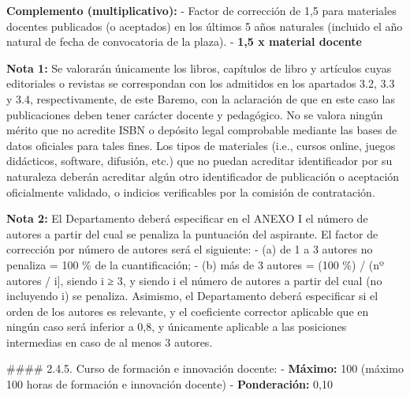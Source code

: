 \documentclass{article}
\begin{document}
\begin{itemize}
\begin{itemize}
\begin{scriptsize}
                  \textbf{Complemento (multiplicativo):}
                  - Factor de corrección de 1,5 para materiales docentes publicados (o aceptados) en los últimos 5 años naturales (incluido el año natural de fecha de convocatoria de la plaza).
                  - \textbf{1,5 x material docente}

                  \textbf{Nota 1:} Se valorarán únicamente los libros, capítulos de libro y artículos cuyas editoriales o revistas se correspondan con los admitidos en los apartados 3.2, 3.3 y 3.4, respectivamente, de este Baremo, con la aclaración de que en este caso las publicaciones deben tener carácter docente y pedagógico. No se valora ningún mérito que no acredite ISBN o depósito legal comprobable mediante las bases de datos oficiales para tales fines. Los tipos de materiales (i.e., cursos online, juegos didácticos, software, difusión, etc.) que no puedan acreditar identificador por su naturaleza deberán acreditar algún otro identificador de publicación o aceptación oficialmente validado, o indicios verificables por la comisión de contratación.

                  \textbf{Nota 2:} El Departamento deberá especificar en el ANEXO I el número de autores a partir del cual se penaliza la puntuación del aspirante. El factor de corrección por número de autores será el siguiente:
                  - (a) de 1 a 3 autores no penaliza = 100 \% de la cuantificación;
                  - (b) más de 3 autores = (100 \%) / (nº autores / i], siendo i ≥ 3, y siendo i el número de autores a partir del cual (no incluyendo i) se penaliza. Asimismo, el Departamento deberá especificar si el orden de los autores es relevante, y el coeficiente corrector aplicable que en ningún caso será inferior a 0,8, y únicamente aplicable a las posiciones intermedias en caso de al menos 3 autores.

                  \#\#\#\# 2.4.5. Curso de formación e innovación docente:
                  - \textbf{Máximo:} 100 (máximo 100 horas de formación e innovación docente)
                  - \textbf{Ponderación:} 0,10


\end{scriptsize}
\end{itemize}
\end{itemize}
\end{document}
